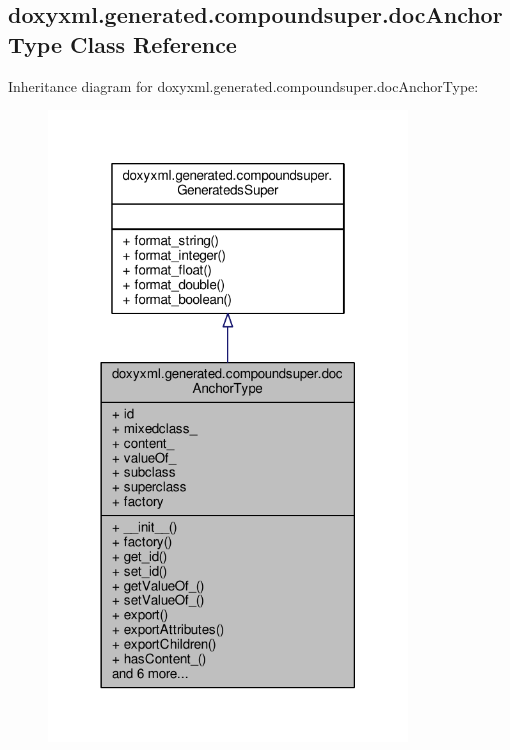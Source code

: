 \subsection{doxyxml.\+generated.\+compoundsuper.\+doc\+Anchor\+Type Class Reference}
\label{classdoxyxml_1_1generated_1_1compoundsuper_1_1docAnchorType}


Inheritance diagram for doxyxml.\+generated.\+compoundsuper.\+doc\+Anchor\+Type\+:
\nopagebreak
\begin{figure}[H]
\begin{center}
\leavevmode
\includegraphics[width=270pt]{d9/da9/classdoxyxml_1_1generated_1_1compoundsuper_1_1docAnchorType__inherit__graph}
\end{center}
\end{figure}


